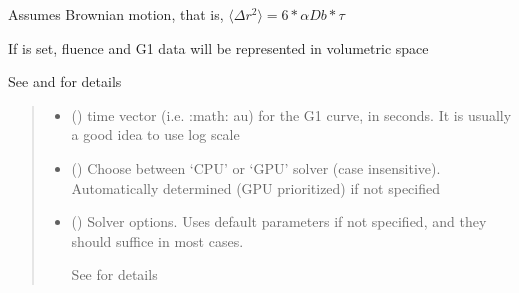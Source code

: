 \documentclass[letterpaper,10pt,english]{sphinxmanual}
\begin{document}
\begin{fulllineitems}
\begin{fulllineitems}
\sphinxAtStartPar
Assumes Brownian motion, that is, \(\langle\Delta r^2\rangle=6*\alpha Db*\tau\)

\sphinxAtStartPar
If  is set, fluence and G1 data will be represented in volumetric space

\sphinxAtStartPar
See {\hyperref[\detokenize{_autosummary/nirfasterff.forward.femdata.femdata_DCS:nirfasterff.forward.femdata.femdata_DCS}]{}} and {\hyperref[\detokenize{_autosummary/nirfasterff.forward.femdata.femdata_stnd_CW:nirfasterff.forward.femdata.femdata_stnd_CW}]{}} for details
\begin{quote}\begin{description}
\begin{itemize}
\item {} 
\sphinxAtStartPar
{} () \textendash{} time vector (i.e. :math:\textasciigrave{}   au\textasciigrave{}) for the G1 curve, in seconds. It is usually a good idea to use log scale

\item {} 
\sphinxAtStartPar
{} (\sphinxstyleliteralemphasis{\sphinxupquote{, }}) \textendash{} Choose between ‘CPU’ or ‘GPU’ solver (case insensitive). Automatically determined (GPU prioritized) if not specified

\item {} 
\sphinxAtStartPar
{} ({\hyperref[\detokenize{_autosummary/nirfasterff.utils.SolverOptions:nirfasterff.utils.SolverOptions}]{}}\sphinxstyleliteralemphasis{\sphinxupquote{, }}) \textendash{} 
\sphinxAtStartPar
Solver options. Uses default parameters if not specified, and they should suffice in most cases.

\sphinxAtStartPar
See {\hyperref[\detokenize{_autosummary/nirfasterff.utils.SolverOptions:nirfasterff.utils.SolverOptions}]{}} for details


\end{itemize}


\end{description}
\end{quote}
\end{fulllineitems}
\end{fulllineitems}
\end{document}
